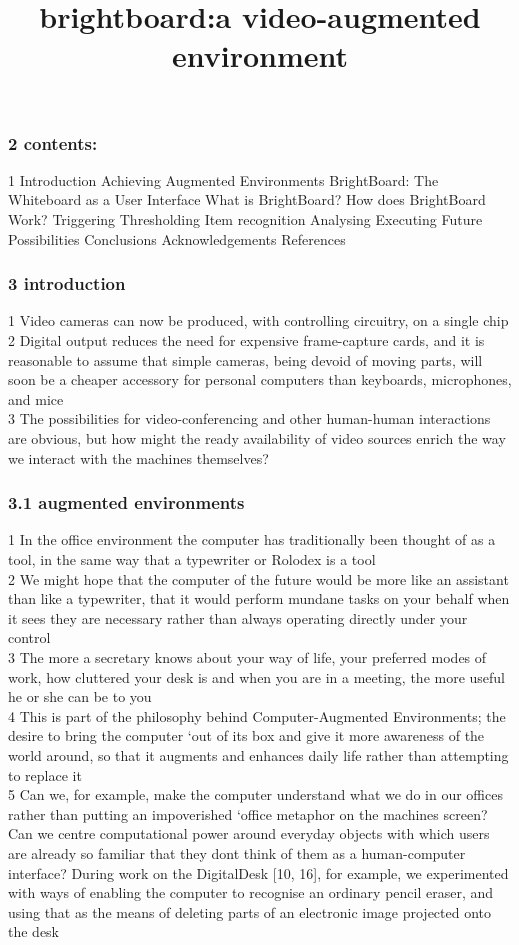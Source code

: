 \documentclass{beamer}
\title[Short Title]{brightboard:a video-augmented environment}
\begin{document}
\maketitle
\begin{frame}
\frametitle{2 contents:}
1                Introduction       Achieving Augmented Environments       BrightBoard: The Whiteboard as a User Interface       What is BrightBoard?       How does BrightBoard Work?               Triggering         Thresholding         Item recognition         Analysing         Executing               Future Possibilities       Conclusions       Acknowledgements       References             \\
\end{frame}
\begin{frame}
\frametitle{3 introduction}
1  Video cameras can now be produced, with controlling circuitry, on a single chip \\2  Digital output reduces the need for expensive frame-capture cards, and it is reasonable to assume that simple cameras, being devoid of moving parts, will soon be a cheaper accessory for personal computers than keyboards, microphones, and mice \\3  The possibilities for video-conferencing and other human-human interactions are obvious, but how might the ready availability of video sources enrich the way we interact with the machines themselves?     \\
\end{frame}
\begin{frame}
\frametitle{3.1 augmented environments}
1  In the office environment the computer has traditionally been thought of as a tool, in the same way that a typewriter or Rolodex is a tool \\2      We might hope that the computer of the future would be more like an assistant than like a typewriter, that it would perform mundane tasks on your behalf when it sees they are necessary rather than always operating directly under your control \\3  The more a secretary knows about your way of life, your preferred modes of work, how cluttered your desk is and when you are in a meeting, the more useful he or she can be to you \\4      This is part of the philosophy behind Computer-Augmented Environments; the desire to bring the computer `out of its box and give it more awareness of the world around, so that it augments and enhances daily life rather than attempting to replace it \\5  Can we, for example, make the computer understand what we do in our offices rather than putting an impoverished `office metaphor on the machines screen? Can we centre computational power around everyday objects with which users are already so familiar that they dont think of them as a human-computer interface? During work on the DigitalDesk [10, 16], for example, we experimented with ways of enabling the computer to recognise an ordinary pencil eraser, and using that as the means of deleting parts of an electronic image projected onto the desk \\
\end{frame}
\end{document}
